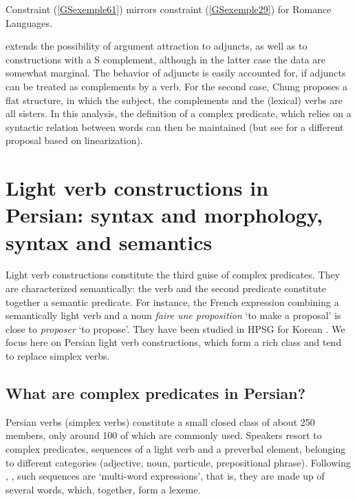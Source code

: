 \documentclass[output=paper
                ,modfonts
                ,nonflat
	        ,collection
	        ,collectionchapter
	        ,collectiontoclongg
 	        ,biblatex
                ,babelshorthands
                ,newtxmath
                ,draftmode
                ,colorlinks, citecolor=brown
]{./langsci/langscibook}
\begin{document}
{Constraint (\ref{GSexemple61}) mirrors constraint (\ref{GSexemple29}) for Romance Languages.

\begin{exe} 
\end{exe}

\cite{CC1998} extends the possibility of argument attraction to adjuncts, as well as to constructions with a S complement, although in the latter case the data are somewhat marginal. The behavior of adjuncts is easily accounted for, if adjuncts can be treated as complements \citep{bouma2001satisfying} by a verb. For the second case, Chung proposes a flat structure, in which the subject, the complements and the (lexical) verbs are all sisters. In this analysis, the definition of a complex predicate, which relies on a syntactic relation between words can then be maintained (but see \citealt{lee2001argument} for a different proposal based on linearization).

\section{Light verb constructions in Persian: syntax and morphology, syntax and semantics}\label{GSsection5}

Light verb constructions constitute the third guise of complex predicates. They are characterized semantically: the verb and the second predicate constitute together a semantic predicate. For instance, the French expression combining a semantically light verb and a noun \textit{faire une proposition} `to make a proposal’ is close to \textit{proposer} `to propose’. They have been studied in HPSG for Korean \citep{Ryu:93, lee2001argument, choi2001mixed, Kim2016a-u}. We focus here on Persian light verb constructions, which form a rich class and tend to replace simplex verbs.   
    
\subsection{What are complex predicates in Persian?}\label{GSsection5.1}

Persian verbs (simplex verbs) constitute a small closed class of about 250 members, only around 100 of which are commonly used. Speakers resort to complex predicates, sequences of a light verb and a preverbal element, belonging to different categories (adjective, noun, particule, prepositional phrase). Following \cite{bonami2010persian}, \cite{pollet2012grammaire}, such sequences are `multi-word expressions', that is, they are made up of several words, which, together, form a lexeme. 

}
\end{document}
